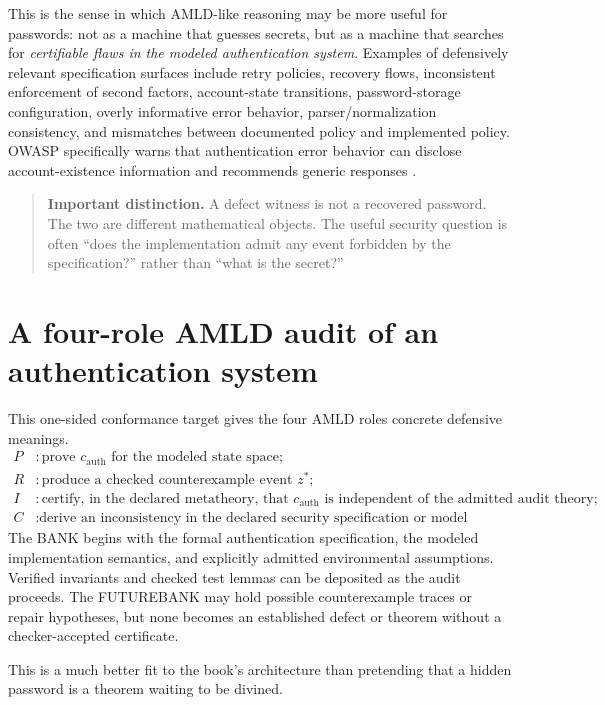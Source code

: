 \documentclass[11pt,openany]{book}
\theoremstyle{definition}
\theoremstyle{remark}
\newenvironment{warningbox}{\begin{quote}\small\color{red!50!black}\textbf{Important distinction.} }{\end{quote}}
\begin{document}
This is the sense in which AMLD-like reasoning may be more useful for passwords: not as a machine that guesses secrets, but as a machine that searches for \emph{certifiable flaws in the modeled authentication system}. Examples of defensively relevant specification surfaces include retry policies, recovery flows, inconsistent enforcement of second factors, account-state transitions, password-storage configuration, overly informative error behavior, parser/normalization consistency, and mismatches between documented policy and implemented policy. OWASP specifically warns that authentication error behavior can disclose account-existence information and recommends generic responses \cite{OWASPAuth}.

\begin{warningbox}
A defect witness is not a recovered password. The two are different mathematical objects. The useful security question is often ``does the implementation admit any event forbidden by the specification?'' rather than ``what is the secret?''
\end{warningbox}

\section{A four-role AMLD audit of an authentication system}
This one-sided conformance target gives the four AMLD roles concrete defensive meanings.
\begin{align*}
P &: \text{prove }c_{\mathrm{auth}}\text{ for the modeled state space};\\
R &: \text{produce a checked counterexample event }z^*;\\
I &: \text{certify, in the declared metatheory, that }c_{\mathrm{auth}}\text{ is independent of the admitted audit theory};\\
C &: \text{derive an inconsistency in the declared security specification or model assumptions.}
\end{align*}
The BANK begins with the formal authentication specification, the modeled implementation semantics, and explicitly admitted environmental assumptions. Verified invariants and checked test lemmas can be deposited as the audit proceeds. The FUTUREBANK may hold possible counterexample traces or repair hypotheses, but none becomes an established defect or theorem without a checker-accepted certificate.

This is a much better fit to the book's architecture than pretending that a hidden password is a theorem waiting to be divined.
\end{document}

